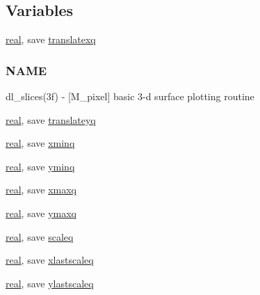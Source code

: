 \subsection*{Variables}
\begin{DoxyCompactItemize}
\item 
\hyperlink{read__watch_83_8txt_abdb62bde002f38ef75f810d3a905a823}{real}, save \hyperlink{namespacem__pixel__slices_a984b384660455b08f81e6ba889c4f181}{translatexq}
\begin{DoxyCompactList}\small\item\em \subsubsection*{N\+A\+ME}

dl\+\_\+slices(3f) -\/ \mbox{[}M\+\_\+pixel\mbox{]} basic 3-\/d surface plotting routine \end{DoxyCompactList}\item 
\hyperlink{read__watch_83_8txt_abdb62bde002f38ef75f810d3a905a823}{real}, save \hyperlink{namespacem__pixel__slices_ac0ed11bf15d4d4bf8a97194d64035b02}{translateyq}
\item 
\hyperlink{read__watch_83_8txt_abdb62bde002f38ef75f810d3a905a823}{real}, save \hyperlink{namespacem__pixel__slices_a982eea046c0a07e9767fac51b96e9c5b}{xminq}
\item 
\hyperlink{read__watch_83_8txt_abdb62bde002f38ef75f810d3a905a823}{real}, save \hyperlink{namespacem__pixel__slices_afc89e60a080837a7d23abc70409bcde7}{yminq}
\item 
\hyperlink{read__watch_83_8txt_abdb62bde002f38ef75f810d3a905a823}{real}, save \hyperlink{namespacem__pixel__slices_a72480fe0bf407c578fb6c6c01b929447}{xmaxq}
\item 
\hyperlink{read__watch_83_8txt_abdb62bde002f38ef75f810d3a905a823}{real}, save \hyperlink{namespacem__pixel__slices_a9f789eabf3f49da6fdd6c713642836c5}{ymaxq}
\item 
\hyperlink{read__watch_83_8txt_abdb62bde002f38ef75f810d3a905a823}{real}, save \hyperlink{namespacem__pixel__slices_a560f9a31fb656d89f985a6bb0c00d815}{scaleq}
\item 
\hyperlink{read__watch_83_8txt_abdb62bde002f38ef75f810d3a905a823}{real}, save \hyperlink{namespacem__pixel__slices_ae99e40f4f0b19ff8415ac84db8532f0d}{xlastscaleq}
\item 
\hyperlink{read__watch_83_8txt_abdb62bde002f38ef75f810d3a905a823}{real}, save \hyperlink{namespacem__pixel__slices_a15c58d927d442047ca7d648b32b0971a}{ylastscaleq}

\end{DoxyCompactItemize}
